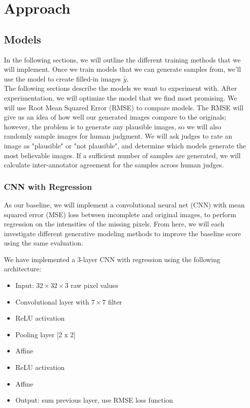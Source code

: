 \documentclass[10pt,twocolumn,letterpaper]{article}
\begin{document}
\section{Approach}

\subsection{Models}
In the following sections, we will outline the different training methods that we will implement. Once we train models that we can generate samples from, we'll use the model to create filled-in images $\hat{y}$. \\

The following sections describe the models we want to experiment with. After experimentation, we will optimize the model that we find most promising. We will use Root Mean Squared Error (RMSE) to compare models. The RMSE will give us an idea of how well our generated images compare to the originals; however, the problem is to generate any plausible images, so we will also randomly sample images for human judgment. We will ask judges to rate an image as "plausible" or "not plausible", and determine which models generate the most believable images. If a sufficient number of samples are generated, we will calculate inter-annotator agreement for the samples across human judges. 

\subsubsection{CNN with Regression}
\par As our baseline, we will implement a convolutional neural net (CNN) with mean squared error (MSE) loss between incomplete and original images, to perform regression on the intensities of the missing pixels. From here, we will each investigate different generative modeling methods to improve the baseline score using the same evaluation.

We have implemented a 3-layer CNN with regression using the following architecture: 
\begin{itemize}
\item Input: $32  \times  32  \times  3$ raw pixel values
\item Convolutional layer with $7  \times  7$ filter
\item ReLU activation
\item Pooling layer [2 x 2]
\item Affine
\item ReLU activation
\item Affine
\item Output: sum previous layer, use RMSE loss function
\end{itemize}
\end{document}
